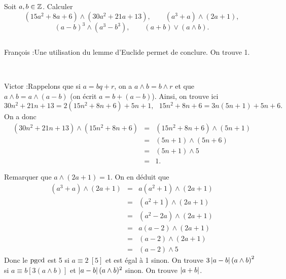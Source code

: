 \documentclass{magnolia}
\begin{document}
Soit $a, b\in\mathbb{Z}$. Calculer
\[(15a^2+8a+6)\wedge(30a^2+21a+13), \qquad (a^3+a)\wedge(2a+1),\]
\[(a-b)^3 \wedge (a^3-b^3), \qquad (a+b)\vee (a \wedge b).\]
\begin{sol}
$\quad$
\begin{questions}
\question 
\begin{francois}
François :Une utilisation du lemme d'Euclide permet de conclure. On trouve 1.
\end{francois}\\
\begin{victor}
Victor :Rappelons que si $a=bq+r$, on a $a\wedge b=b\wedge r$ et que $a\wedge b=a\wedge (a-b)$ (on écrit $a=b+(a-b)$).
Ainsi, on trouve ici
$$30n^2+21n+13=2(15n^2+8n+6)+5n+1,\ \ \ 15n^2+8n+6=3n(5n+1)+5n+6.$$
On a donc
\begin{eqnarray*}
(30n^2+21n+13)\wedge (15n^2+8n+6)&=&(15n^2+8n+6)\wedge (5n+1)\\
&=&(5n+1)\wedge (5n+6)\\
&=&(5n+1)\wedge 5\\
&=&1.
\end{eqnarray*}
\end{victor}
\question Remarquer que $a\wedge (2a+1)=1$. On en déduit que
  \begin{eqnarray*}
  (a^3+a)\wedge (2a+1)
  &=& a(a^2+1)\wedge (2a+1)\\
  &=& (a^2+1)\wedge (2a+1)\\
  &=& (a^2-2a)\wedge (2a+1)\\
  &=& a(a-2)\wedge (2a+1)\\
  &=& (a-2)\wedge (2a+1)\\
  &=& (a-2)\wedge 5
  \end{eqnarray*}
  Donc le $\operatorname{pgcd}$ est 5 si $a\equiv 2\ [5]$ et est égal à 1 sinon.
\question On trouve $3\left|a-b\right|\left(a\wedge b\right)^2$ si $a\equiv b [3(a\wedge b)]$
  et $\left|a-b\right|(a\wedge b)^2$ sinon.
\question On trouve $\left|a+b\right|$.
\end{questions}
\end{sol}
\end{document}
